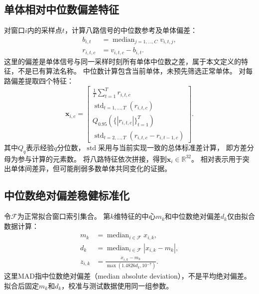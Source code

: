 \documentclass[UTF8,a4paper,12pt,fontset=fandol]{ctexart}
\DeclareMathOperator{\med}{median}
\DeclareMathOperator{\Std}{std}
\begin{document}
\subsection{单体相对中位数偏差特征}

对窗口$i$内的采样点$t$，计算八路信号的中位数参考及单体偏差：
\begin{equation}
\begin{aligned}
  b_{i,t} &= \med_{j=1,\ldots,C}v_{i,t,j}, \\
  r_{i,t,c} &= v_{i,t,c}-b_{i,t}.
  \end{aligned}
  \label{eq:residual}
\end{equation}
这里的偏差是单体信号与同一采样时刻所有单体中位数之差，属于本文定义的特征，不是已有算法名称。
中位数计算包含当前单体，未预先筛选正常单体。
对每路偏差提取四个特征：
\begin{equation}
  \mathbf{x}_{i,c}=
  \begin{bmatrix}
    \displaystyle\frac{1}{T}\sum_{t=1}^{T}r_{i,t,c} \\
    \Std_{t=1,\ldots,T}(r_{i,t,c}) \\
    Q_{0.95}\!\left(\{|r_{i,t,c}|\}_{t=1}^{T}\right) \\
    \Std_{t=2,\ldots,T}(r_{i,t,c}-r_{i,t-1,c})
  \end{bmatrix}.
  \label{eq:feature}
\end{equation}
其中$Q_q$表示经验$q$分位数，$\Std$采用与当前实现一致的总体标准差计算，
即方差分母为参与计算的元素数。
将八路特征依次拼接，得到$\mathbf{x}_i\in\mathbb{R}^{32}$。
相对表示用于突出单体间差异，但可能削弱多数单体共同变化的证据。

\subsection{中位数绝对偏差稳健标准化}

令$\mathcal{F}$为正常拟合窗口索引集合。
第$k$维特征的中心$m_k$和中位数绝对偏差$d_k$仅由拟合数据计算：
\begin{equation}
\begin{aligned}
  m_k &= \med_{i\in\mathcal{F}}x_{i,k}, \\
  d_k &= \med_{i\in\mathcal{F}}|x_{i,k}-m_k|, \\
  z_{i,k} &= \frac{x_{i,k}-m_k}{\max(1.4826d_k,10^{-7})}.
  \end{aligned}
  \label{eq:scale}
\end{equation}
这里MAD指中位数绝对偏差（median absolute deviation），不是平均绝对偏差\cite{leys2013}。
拟合后固定$m_k$和$d_k$，校准与测试数据使用同一组参数。
\end{document}
